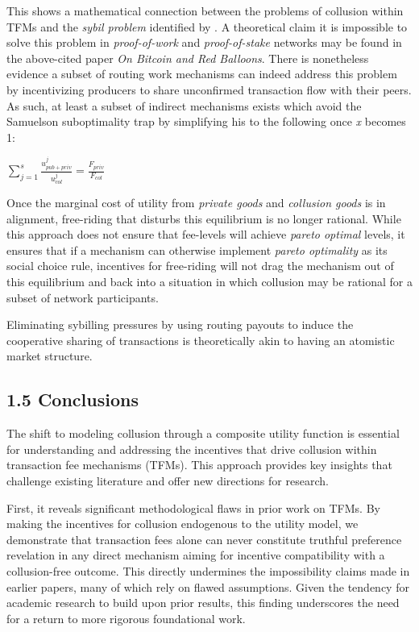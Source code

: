 \documentclass[oneside]{article}   	%
\begin{document}
This shows a mathematical connection between the problems of collusion within TFMs and the \textit{sybil problem} identified by \cite{babaioffredballoons}. A theoretical claim it is impossible to solve this problem in \textit{proof-of-work} and \textit{proof-of-stake} networks may be found in the above-cited paper \textit{On Bitcoin and Red Balloons}. There is nonetheless evidence a subset of routing work mechanisms can indeed address this problem by incentivizing producers to share unconfirmed transaction flow with their peers. As such, at least a subset of indirect mechanisms exists which avoid the Samuelson suboptimality trap by simplifying his to the following once \textit{x} becomes 1:

\LARGE
\begin{adjustwidth}{1.5em}{1.5em}
\begin{math}
\sum_{j=1}^{s} \frac{u_{{pub}+{priv}}^j}{u_{col}^j} = \frac{F_{{priv}}}{F_{col}}
\end{math}
\end{adjustwidth}
\normalsize

Once the marginal cost of utility from \textit{private goods} and \textit{collusion goods} is in alignment, free-riding that disturbs this equilibrium is no longer rational. While this approach does not ensure that fee-levels will achieve \textit{pareto optimal} levels, it ensures that if a mechanism can otherwise implement \textit{pareto optimality} as its social choice rule, incentives for free-riding will not drag the mechanism out of this equilibrium and back into a situation in which collusion may be rational for a subset of network participants.

Eliminating sybilling pressures by using routing payouts to induce the cooperative sharing of transactions is theoretically akin to having an atomistic market structure.

\subsection*{1.5 Conclusions}

The shift to modeling collusion through a composite utility function is essential for understanding and addressing the incentives that drive collusion within transaction fee mechanisms (TFMs). This approach provides key insights that challenge existing literature and offer new directions for research.

First, it reveals significant methodological flaws in prior work on TFMs. By making the incentives for collusion endogenous to the utility model, we demonstrate that transaction fees alone can never constitute truthful preference revelation in any direct mechanism aiming for incentive compatibility with a collusion-free outcome. This directly undermines the impossibility claims made in earlier papers, many of which rely on flawed assumptions. Given the tendency for academic research to build upon prior results, this finding underscores the need for a return to more rigorous foundational work.
\end{document}
